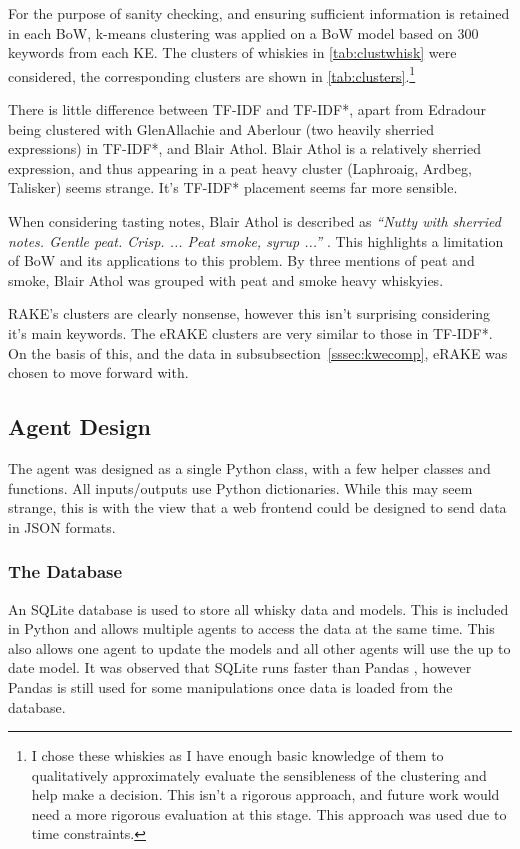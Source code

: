 For the purpose of sanity checking, and ensuring sufficient information is retained in each BoW,
k-means clustering was applied on a BoW model based on 300 keywords from each KE. The clusters of whiskies in 
\autoref{tab:clustwhisk} were considered, the corresponding clusters are shown in \autoref{tab:clusters}.\footnote{I
chose these whiskies as I have enough basic knowledge of them to qualitatively approximately evaluate the sensibleness
of the clustering and help make a decision. This isn't a rigorous approach, and future work would need a more rigorous
evaluation at this stage.  This approach was used due to time constraints.}

There is little difference between TF-IDF and TF-IDF*, apart from Edradour being clustered with GlenAllachie and Aberlour 
(two heavily sherried expressions) in TF-IDF*, and Blair Athol.  Blair Athol is a relatively sherried expression,
and thus appearing in a peat heavy cluster (Laphroaig, Ardbeg, Talisker) seems strange. It's TF-IDF* placement
 seems far more sensible.

When considering tasting notes, Blair Athol is described as 
\emph{``Nutty with sherried notes. Gentle peat. Crisp. ... Peat smoke, syrup ...''} \cite{mom_ba}.  This highlights a limitation
of BoW and its applications to this problem. By three mentions of peat and smoke, Blair Athol was grouped
with peat and smoke heavy whiskyies.

RAKE's clusters are clearly nonsense, however this isn't surprising considering it's main keywords. The eRAKE clusters
are very similar to those in TF-IDF*.  On the basis of this, and the data in subsubsection~\ref{sssec:kwecomp}, eRAKE was
chosen to move forward with.

\subsection{Agent Design}\label{ssec:phase2}
The agent was designed as a single Python class, with a few helper classes and functions.  
All inputs/outputs use Python dictionaries.  While this may seem strange, this is with the view that a web frontend
could be designed to send data in JSON formats.

\subsubsection{The Database}\label{sssec:db}
An SQLite database is used to store all whisky data and models.  This is included in Python and
allows multiple agents to access the data at the same time.  This also allows one agent to update the models
and all other agents will use the up to date model.  It was observed that SQLite runs faster than 
Pandas \cite{reback2020pandas}, however Pandas is still used 
for some manipulations once data is loaded from the database.


